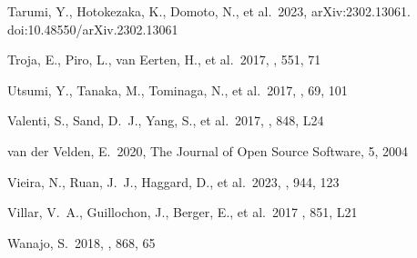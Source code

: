 \documentclass[twocolumn,twocolappendix]{aastex63}
\begin{document}
{\begin{thebibliography}{}


 Tarumi, Y., Hotokezaka, K., Domoto, N., et al.\ 2023, arXiv:2302.13061. doi:10.48550/arXiv.2302.13061


 Troja, E., Piro, L., van Eerten, H., et al.\ 2017, \nat, 551, 71


 Utsumi, Y., Tanaka, M., Tominaga, N., et al.\ 2017, \pasj, 69, 101


 Valenti, S., Sand, D.~J., Yang, S., et al.\ 2017, \apjl, 848, L24


 van der Velden, E.\ 2020, The Journal of Open Source Software, 5, 2004




 Vieira, N., Ruan, J.~J., Haggard, D., et al.\ 2023, \apj, 944, 123

Villar, V.~A., Guillochon, J., Berger, E., et al.\ 2017 \aj, 851, L21












 Wanajo, S.\ 2018, \apj, 868, 65



\end{thebibliography}}
\end{document}
